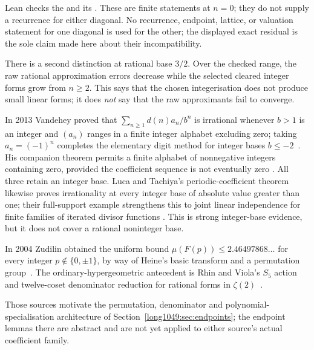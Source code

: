 \documentclass[11pt]{article}
\begin{document}
Lean checks the
 and its
.  These are finite statements at $n=0$; they do not supply a
recurrence for either diagonal.  No recurrence, endpoint, lattice, or
valuation statement for one diagonal is used for the other; the displayed
exact residual is the sole claim made here about their incompatibility.

There is a second distinction at rational base $3/2$.  Over the checked range,
the raw rational approximation errors decrease while the selected cleared
integer forms grow from $n\ge2$.  This says that the chosen integerisation does
not produce small linear forms; it does \emph{not} say that the raw approximants
fail to converge.

In 2013 Vandehey proved that
$\sum_{n\ge1}d(n)a_n/b^n$ is irrational whenever $b>1$ is an integer and
$(a_n)$ ranges in a finite integer alphabet excluding zero; taking
$a_n=(-1)^n$ completes the elementary digit method for integer bases
$b\le-2$~\cite[Thm.~1.2, p.~2]{vandehey2013}.  His companion theorem permits
a finite alphabet of nonnegative integers containing zero, provided the
coefficient sequence is not eventually zero
\cite[Thm.~1.1, p.~2]{vandehey2013}.  All
three retain an integer base.  Luca and Tachiya's periodic-coefficient theorem
likewise proves irrationality at every integer base of absolute value greater
than one; their full-support example strengthens this to joint linear
independence for finite families of iterated divisor functions
\cite[Theorem~A, p.~139; Example~1, p.~140]{lucatachiya2017}.  This is strong
integer-base evidence, but it does not cover a rational noninteger base.

In 2004 Zudilin obtained the uniform bound
$\mu(F(p))\le2.46497868\ldots$ for every integer
$p\notin\{0,\pm1\}$, by way of Heine's basic transform and a permutation
group~\cite[Thm.~1, p.~154; Secs.~4--5, pp.~159--162]{zudilin2004}.
The ordinary-hypergeometric antecedent is Rhin and Viola's $S_5$ action and
twelve-coset denominator reduction for rational forms in
$\zeta(2)$~\cite[Sec.~3, pp.~38--42; Sec.~4, pp.~46--51]{rhinviola1996}.

Those sources motivate the permutation, denominator and polynomial-
specialisation architecture of Section~\ref{long1049:sec:endpoints}; the endpoint
lemmas there are abstract and are not yet applied to either source's actual
coefficient family.
\end{document}
